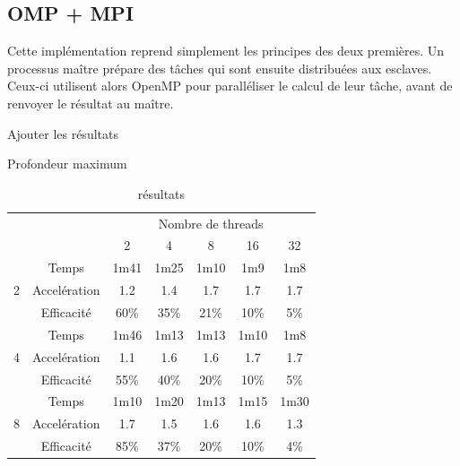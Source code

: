 \documentclass[12pt]{article}
\begin{document}
    \subsection{OMP + MPI}
    Cette implémentation reprend simplement 
    les principes des deux premières. Un processus maître prépare des tâches
    qui sont ensuite distribuées aux esclaves. Ceux-ci utilisent alors OpenMP
    pour paralléliser le calcul de leur tâche, avant de renvoyer le résultat
    au maître.\\
    \par {\color{red} Ajouter les résultats}
    \begin{table} \begin{center}
        \begin{sideways} \hspace{-2.4cm}Profondeur maximum \end{sideways}
        \begin{tabular}{|c|c|c|c|c|c|c|}
            \multicolumn{2}{c}{} & \multicolumn{5}{c}{Nombre de threads} \\
            \cline{3-7}
            \multicolumn{2}{c|}{} & 2 & 4 & 8 & 16 & 32 \\
            \hline
            \multirow{3}{*}{2} & Temps          & 1m41 & 1m25 & 1m10 & 1m9  & 1m8 \\
            \cline{2-7}
                              & Accelération    & 1.2  & 1.4  & 1.7  & 1.7  & 1.7 \\
            \cline{2-7}
                              & Efficacité      & 60\% & 35\% & 21\% & 10\% & 5\% \\
            \hline \hline
            \multirow{3}{*}{4} & Temps          & 1m46 & 1m13 & 1m13 & 1m10 & 1m8 \\
            \cline{2-7}
                              & Accelération    & 1.1  & 1.6  & 1.6  & 1.7  & 1.7 \\
            \cline{2-7}
                              & Efficacité      & 55\% & 40\% & 20\% & 10\% & 5\% \\
            \hline \hline
            \multirow{3}{*}{8} & Temps          & 1m10 & 1m20 & 1m13 & 1m15 & 1m30 \\
            \cline{2-7}
                              & Accelération    & 1.7  & 1.5  & 1.6  & 1.6  & 1.3  \\
            \cline{2-7}
                              & Efficacité      & 85\% & 37\% & 20\% & 10\% & 4\%  \\
            \hline
        \end{tabular}
        \caption{\label{tab:omp1}\color{red} résultats}
    \end{center} \end{table}
\end{document}

